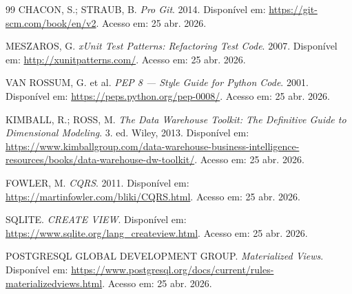\documentclass[monografia,abnt]{inf-ufg-modificado}
\begin{document}
\begin{thebibliography}{99}
CHACON, S.; STRAUB, B. \textit{Pro Git}. 2014. Disponível em: \url{https://git-scm.com/book/en/v2}. Acesso em: 25 abr. 2026.

MESZAROS, G. \textit{xUnit Test Patterns: Refactoring Test Code}. 2007. Disponível em: \url{http://xunitpatterns.com/}. Acesso em: 25 abr. 2026.

VAN ROSSUM, G. et al. \textit{PEP 8 --- Style Guide for Python Code}. 2001. Disponível em: \url{https://peps.python.org/pep-0008/}. Acesso em: 25 abr. 2026.

KIMBALL, R.; ROSS, M. \textit{The Data Warehouse Toolkit: The Definitive Guide to Dimensional Modeling}. 3. ed. Wiley, 2013. Disponível em: \url{https://www.kimballgroup.com/data-warehouse-business-intelligence-resources/books/data-warehouse-dw-toolkit/}. Acesso em: 25 abr. 2026.

FOWLER, M. \textit{CQRS}. 2011. Disponível em: \url{https://martinfowler.com/bliki/CQRS.html}. Acesso em: 25 abr. 2026.

SQLITE. \textit{CREATE VIEW}. Disponível em: \url{https://www.sqlite.org/lang_createview.html}. Acesso em: 25 abr. 2026.

POSTGRESQL GLOBAL DEVELOPMENT GROUP. \textit{Materialized Views}. Disponível em: \url{https://www.postgresql.org/docs/current/rules-materializedviews.html}. Acesso em: 25 abr. 2026.

\end{thebibliography}
\end{document}
